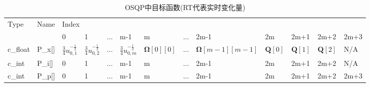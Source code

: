 \begin{table}[htbp]
  \caption{OSQP中目标函数(RT代表实时变化量)}
  \centering
  \begin{tabular}{@{}lllllllllllll@{}}
  \toprule
  \multirow{2}{*}{Type} & \multirow{2}{*}{Name} & \multicolumn{10}{l}{Index}  &   \\ \cmidrule(l){3-13} 
  &   & 0 & 1 & ... & m-1 & m     & ... & 2m-1 & 2m & 2m+1 & 2m+2 & 2m+3 \\ \cmidrule(r){1-2}
  c\_float  & P\_x{[}{]}  & $\frac{3}{4} u_{0,1}^{-\frac{1}{2}}$ & $\frac{3}{4} u_{0,2}^{-\frac{1}{2}}$ & ... & $\frac{3}{4} u_{0,m}^{-\frac{1}{2}}$ & $\bm{\Omega}[0][0]$ & ... & $\bm{\Omega}[m-1][m-1]$ & $\bm{Q}[0]$ & $\bm{Q}[1]$ & $\bm{Q}[2]$ & N/A  \\
  c\_int  & P\_i{[}{]}    & 0 & 1 & ... & m-1 & m     & ... & 2m-1 & 2m & 2m+1 & 2m+2 & N/A  \\
  c\_int  & P\_p{[}{]}    & 0 & 1 & ... & m-1 & m     & ... & 2m-1 & 2m & 2m+1 & 2m+2 & 2m+3 \\ 
  \bottomrule
  \end{tabular}
 \label{tab:osqpobjective}
\end{table}

